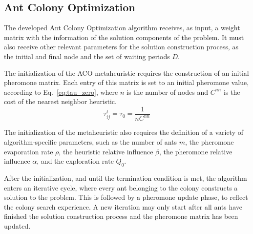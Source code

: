 \subsection{Ant Colony Optimization}
\label{sec:aco}

The developed Ant Colony Optimization algorithm receives, as input, a weight matrix with the information of the solution components of the problem. It must also receive other relevant parameters for the solution construction process, as the initial and final node and the set of waiting periods $D$. 

The initialization of the ACO metaheuristic requires the construction of an initial pheromone matrix. Each entry of this matrix is set to an initial pheromone value, according to Eq.~\ref{eq:tau_zero}, where $n$ is the number of nodes and $C^{nn}$ is the cost of the nearest neighbor heuristic. 
\begin{equation}
\label{eq:tau_zero}
  \tau_{ij}^{t} = \tau_{0} = \frac{1}{nC^{nn}}
\end{equation}

The initialization of the metaheuristic also requires the definition of a variety of algorithm-specific parameters, such as the number of ants $m$, the pheromone evaporation rate $\rho$, the heuristic relative influence $\beta$, the pheromone relative influence $\alpha$, and the exploration rate $Q_0$. 

After the initialization, and until the termination condition is met, the algorithm enters an iterative cycle, where every ant belonging to the colony constructs a solution to the problem. This is followed by a pheromone update phase, to reflect the colony search experience. A new iteration may only start after all ants have finished the solution construction process and the pheromone matrix has been updated.


